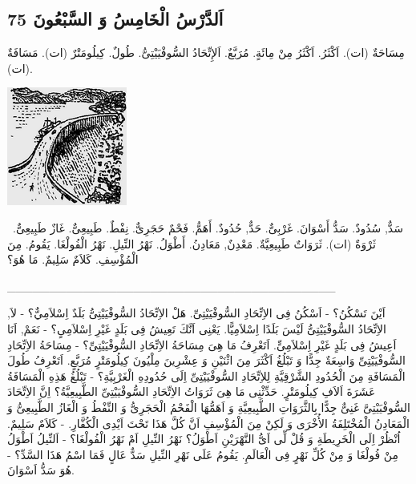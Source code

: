 \documentclass[a5paper]{article}
\begin{document}
\subsection[اَلدَّرْسُ الْخَامِسُ وَ السَّبْعُونَ 75]{اَلدَّرْسُ الْخَامِسُ وَ السَّبْعُونَ 75}
مِسَاحَةٌ (ات). اَكْثَرُ. اَكْثَرُ مِنْ مِائَةٍ. مُرَبَّعٌ. \newline
اَلإِتِّحَادُ السُّوفْيَيْتِىُّ. طُولٌ. كِيلُومَتْرٌ (ات). مَسَافَةٌ (ات). 

 \includegraphics[width=1.552in,height=1.5311in]{MuhammadBagauddinlatinized-img225.png} 

\ سَدٌّ, سُدُودٌ. سَدُّ أَسْوَانَ. غَرْبِىٌّ. حَدٌّ, حُدُودٌ. أَهَمُّ.\newline
فَحْمٌ حَجَرِىٌّ. نِفْطٌ. طَبِيعِىٌّ. غَازٌ طَبِيعِىٌّ. ثَرْوَةٌ (ات). ثَرَوَاتٌ طَبِيعِيَّةٌ. مَعْدِنٌ, مَعَادِنُ. أَطْوَلُ. نَهْرُ النِّيلِ. نَهْرُ الْفُولْغَا. يَقُومُ. مِنَ الْمُؤْسِفِ. كَلاَمٌ سَلِيمٌ. مَا هُوَ؟

\_\_\_\_\_\_\_\_\_\_\_\_\_\_\_\_\_\_\_\_\_\_\_\_\_\_\_\_\_\_\_\_\_\_\_\_\_\_\_

اَيْنَ تَسْكُنُ؟ - اَسْكُنُ فِى الاِتِّحَادِ السُّوفْيَيْتِىِّ. هَلْ الاِتِّحَادُ السُّوفْيَيْتِىُّ بَلَدٌ اِسْلاَمِيٌّ؟ - لاَ, الاِتِّحَادُ السُّوفْيَيْتِىُّ لَيْسَ بَلَدًا اِسْلاَمِيًّا. يَعْنِى اَنَّكَ تَعِيشُ فِى بَلَدٍ غَيْرِ اِسْلاَمِىٍ؟ - نَعَمْ, اَنَا اَعِيشُ فِى بَلَدٍ غَيْرِ اِسْلاَمِىٍّ. اَتَعْرِفُ مَا هِىَ مِسَاحَةُ الاِتِّحَادِ السُّوفْيَيْتِىِّ؟ - مِسَاحَةُ الاِتِّحَادِ السُّوفْيَيْتِىِّ وَاسِعَةٌ جِدًّا وَ تَبْلُغُ اَكْثَرَ مِنَ اثْنَيْنِ وَ عِشْرِينَ مِلْيُونَ كِيلُومَتْرٍ مُرَبَّعٍ. اَتَعْرِفُ طُولَ الْمَسَافَةِ مِنَ الْحُدُودِ الشَّرْقِيَّةِ لِلاِتِّحَادِ السُّوفْيَيْتِىِّ اِلَى حُدُودِهِ الْغَرْبِيَّةِ؟ - تَبْلُغُ هَذِهِ الْمَسَافَةُ عَشَرَةَ اَلاَفِ كِيلُومَتْرٍ. حَدِّثْنِى مَا هِىَ ثَرَوَاتُ الاِتِّحَادِ السُّوفْيَيْتِىِّ الطَّبِيعِيَّةُ؟ اِنَّ الاِتِّحَادَ السُّوفْيَيْتِىَّ غَنِىٌّ جِدًّا بِالثَّرَوَاتِ الطَّبِيعِيَّةِ وَ اَهَمُّهَا الْفَحْمُ الْحَجَرِىُّ وَ النِّفْطُ وَ الْغَازُ الطَّبِيعِىُّ وَ الْمَعَادِنُ الْمُخْتَلِفَةُ الأُخْرَى وَ لَكِنْ مِنَ الْمُؤْسِفِ اَنَّ كُلَّ هَذَا تَحْتَ اَيْدِى الْكُفَّارِ. - كَلاَمٌ سَلِيمٌ. اُنْظُرْ اِلَى الْخَرِيطَةِ وَ قُلْ لِّى اَىُّ النَّهْرَيْنِ اَطْوَلُ؟ نَهْرُ النِّيلِ اَمْ نَهْرُ الْفُولْغَا؟ - اَلنِّيلُ اَطْوَلُ مِنْ فُولْغَا وَ مِنْ كُلِّ نَهْرٍ فِى الْعَالَمِ. يَقُومُ عَلَى نَهْرِ النِّيلِ سَدٌّ عَالٍ فَمَا اسْمُ هَذَا السَّدِّ؟ - هُوَ سَدُّ اَسْوَانَ.
\end{document}
